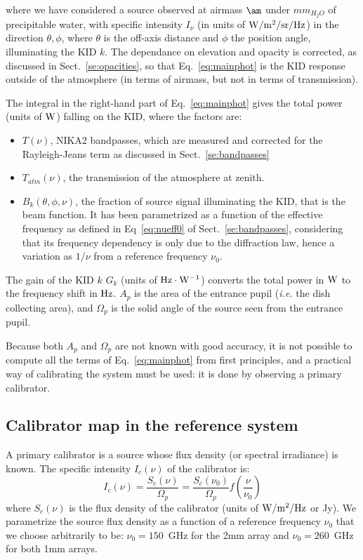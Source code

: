 where we have considered a source observed at airmass $\am$ under
$mm_{H_{2}O}$ of precipitable water, with specific intensity $I_{\nu}$ (in units
of  ${\rm W/m^{2}/sr/Hz}$) in the direction $\theta, \phi$, where $\theta$
is the off-axis distance and $\phi$ the position angle, illuminating the KID $k$. 
The dependance on elevation and opacity is corrected, as discussed in
Sect.~\ref{se:opacities}, so that Eq.~\ref{eq:mainphot} is the KID
response outside of the atmosphere (in terms of airmass, but not in terms
of transmission).

The integral in the right-hand part of Eq.~\ref{eq:mainphot} gives the total power (units of $\rm W$)
falling on the KID, where the factors are:
\begin{itemize}
\item $T(\nu)$, NIKA2 bandpasses, which are measured and corrected for the Rayleigh-Jeans term as discussed in Sect.~\ref{se:bandpasses}
\item $T_{atm}(\nu)$, the transmission of the atmosphere at zenith. 
\item $B_{k} (\theta, \phi, \nu)$, the fraction of source signal illuminating the KID, that is the beam function. It has been parametrized as a function of the effective frequency as defined in Eq~\ref{eq:nueff0} of Sect.~\ref{se:bandpasses},
considering that its frequency dependency is only due to the diffraction law, hence a variation as $1/\nu$ from a reference frequency $\nu_0$.  
\end{itemize}

The gain of the KID $k$ $G_{k}$ (units of  $\rm Hz \cdot \rm W^{-1}$) converts the total power in $\rm W$
to the frequency shift in $\rm Hz$. $A_{p}$ is the area of the entrance pupil ({\it i.e.} the
dish collecting area), and $\Omega_{p}$ is the solid angle of the source seen from the
entrance pupil.

Because  both $A_{p}$ and $ \Omega_{p} $ are not known with good
accuracy, it is not possible to compute all the terms of
Eq.~\ref{eq:mainphot} from first principles, and a practical way of
calibrating the system must be used: it is done by observing a primary
calibrator.


\subsection{Calibrator map in the reference system}

A primary calibrator is a source whose flux density (or spectral irradiance) is
known. %
The specific intensity $I_{c}(\nu)$ of the
calibrator is:
\begin{equation}
I_{c}(\nu) =  \frac{S_{c}(\nu)}{\Omega_{p}} =\frac{ S_{c}
  (\nu_{0})}{\Omega_{p}} f(\frac{\nu}{\nu_{0}})
\label{eq:intensity_calibrator}
\end{equation}
where $S_{c}(\nu)$ is the flux density of the calibrator (units
of $\rm W/m^{2}/Hz$ or Jy). We parametrize the source flux density
as a function of a reference frequency $\nu_{0}$ that we choose
arbitrarily to be: $\nu_{0} = 150$~GHz for the 2mm array and $\nu_{0}
= 260$~GHz for both 1mm arrays. 

